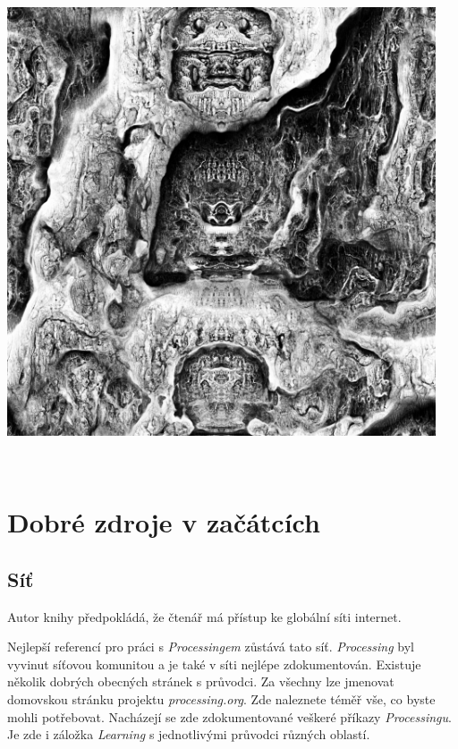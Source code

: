 \documentclass[10pt,twoside=true,open=right,cleardoublepage=empty,chapterprefix=true]{scrbook}
\newcommand{\oddil}[1]{\section{#1}\index{#1}\label{#1}}
\begin{document}
\begin{center}
\includegraphics[width = 0.95\textwidth]{imgs/turingpattern.jpg}
\end{center}

\ 







 







\chapter{Dobré zdroje v začátcích}

\oddil{Síť}

Autor knihy předpokládá, že čtenář má přístup ke globální síti internet.

Nejlepší referencí pro práci s {\em Processingem} zůstává tato síť. {\em Processing} byl vyvinut síťovou komunitou a je také v síti nejlépe zdokumentován. Existuje několik dobrých obecných stránek s průvodci. Za všechny lze jmenovat domovskou stránku projektu {\em processing.org}. Zde naleznete téměř vše, co byste mohli potřebovat. Nacházejí se zde zdokumentované veškeré příkazy {\em Processingu}. Je zde i záložka {\em Learning} s jednotlivými průvodci různých oblastí.
\end{document}
